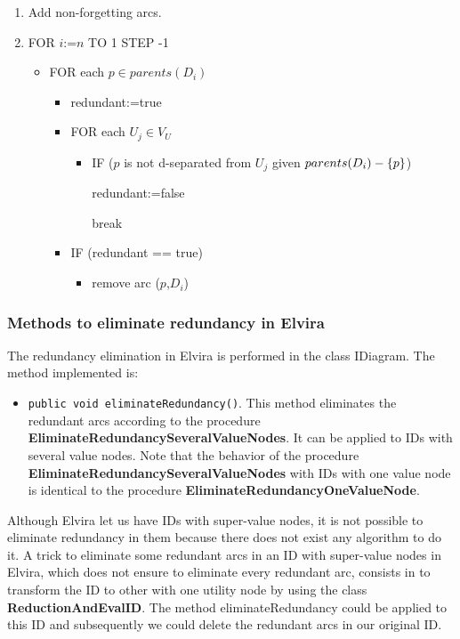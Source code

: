 \begin{enumerate}
\item Add non-forgetting arcs.

\item FOR $i$:=$n$ TO 1 STEP -1

\begin{itemize}
\item FOR each $p\in parents(D_i)$

\begin{itemize}
\item redundant:=true

\item FOR each $U_{j}\in V_{U}$

\begin{itemize}
\item IF ($p$ is not d-separated from $U_{j}$ given $parents(D_{i})-{\{p\}}$)

redundant:=false

break
\end{itemize}

\item IF (redundant == true)

\begin{itemize}
\item remove arc ($p$,$D_{i}$)
\end{itemize}
\end{itemize}
\end{itemize}
\end{enumerate}

\subsubsection{Methods to eliminate redundancy in Elvira}

The redundancy elimination in Elvira is performed in the class IDiagram. The
method implemented is:

\begin{itemize}
\item \texttt{public void eliminateRedundancy()}. This method eliminates the
redundant arcs according to the procedure \textbf{%
EliminateRedundancySeveralValueNodes}. It can be applied to IDs with several
value nodes. Note that the behavior of the procedure \textbf{%
EliminateRedundancySeveralValueNodes} with IDs with one value node is
identical to the procedure \textbf{EliminateRedundancyOneValueNode}.
\end{itemize}

Although Elvira let us have IDs with super-value nodes, it is not possible
to eliminate redundancy in them because there does not exist any algorithm
to do it. A trick to eliminate some redundant arcs in an ID with super-value
nodes in Elvira, which does not ensure to eliminate every redundant arc,
consists in to transform the ID to other with one utility node by using the
class \textbf{ReductionAndEvalID}. The method eliminateRedundancy could be
applied to this ID and subsequently we could delete the redundant arcs in
our original ID.

